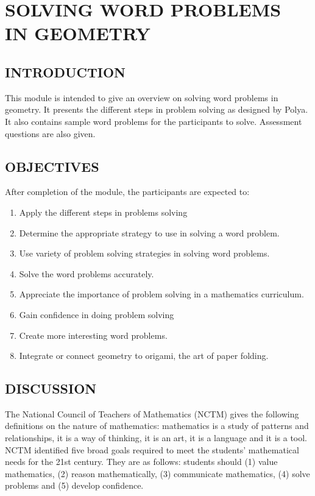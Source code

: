 \chapter[SOLVING WORD PROBLEMS]{SOLVING WORD PROBLEMS\\ IN GEOMETRY}
\section*{INTRODUCTION}
This module is intended to give an overview on solving word problems in geometry. It presents
the different steps in problem solving as designed by Polya. It also contains sample word problems for
the participants to solve. Assessment questions are also given.
\section*{OBJECTIVES}
After completion of the module, the participants are expected to:
\begin{enumerate}
\item Apply the different steps in problems solving
\item Determine the appropriate strategy to use in solving a word problem.
\item Use variety of problem solving strategies in solving word problems.
\item Solve the word problems accurately.
\item Appreciate the importance of problem solving in a mathematics curriculum.
\item Gain confidence in doing problem solving
\item Create more interesting word problems.
\item Integrate or connect geometry to origami, the art of paper folding.
\end{enumerate}
\section*{DISCUSSION}
The National Council of Teachers of Mathematics (NCTM) gives the following definitions on the
nature of mathematics: mathematics is a study of patterns and relationships, it is a way of thinking, it is
an art, it is a language and it is a tool. NCTM identified five broad goals required to meet the students’
mathematical needs for the 21st century. They are as follows: students should (1) value mathematics,
(2) reason mathematically, (3) communicate mathematics, (4) solve problems and (5) develop
confidence.

